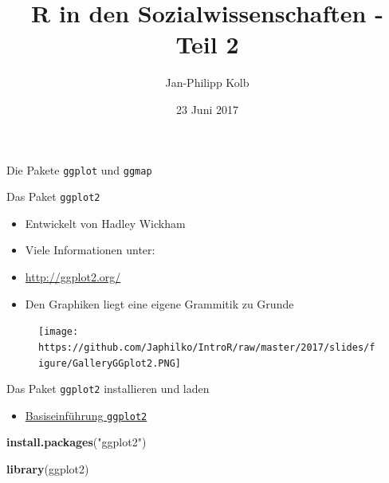 \documentclass[ignorenonframetext,]{beamer}
\title{R in den Sozialwissenschaften - Teil 2}
\author{Jan-Philipp Kolb}
\date{23 Juni 2017}
\newenvironment{Shaded}{}{}
\newcommand{\KeywordTok}[1]{\textcolor[rgb]{0.00,0.44,0.13}{\textbf{{#1}}}}
\newcommand{\StringTok}[1]{\textcolor[rgb]{0.25,0.44,0.63}{{#1}}}
\newcommand{\NormalTok}[1]{{#1}}
\providecommand{\tightlist}{%
\setlength{\itemsep}{0pt}\setlength{\parskip}{0pt}}
\begin{document}
\frame{\titlepage}

\begin{frame}{Die Pakete \texttt{ggplot} und \texttt{ggmap}}

\end{frame}

\begin{frame}{Das Paket \texttt{ggplot2}}

\begin{itemize}
\tightlist
\item
  Entwickelt von Hadley Wickham
\item
  Viele Informationen unter:
\item
  \url{http://ggplot2.org/}
\item
  Den Graphiken liegt eine eigene Grammitik zu Grunde
\end{itemize}

\begin{figure}[htbp]
\centering
\texttt{[image: https://github.com/Japhilko/IntroR/raw/master/2017/slides/figure/GalleryGGplot2.PNG]}
\caption{}
\end{figure}

\end{frame}

\begin{frame}[fragile]{Das Paket \texttt{ggplot2} installieren und
laden}

\begin{itemize}
\tightlist
\item
  \href{www.r-bloggers.com/basic-introduction-to-ggplot2/}{Basiseinführung
  \texttt{ggplot2}}
\end{itemize}

\begin{Shaded}
\begin{Highlighting}[]
\KeywordTok{install.packages}\NormalTok{(}\StringTok{"ggplot2"}\NormalTok{)}
\end{Highlighting}
\end{Shaded}

\begin{Shaded}
\begin{Highlighting}[]
\KeywordTok{library}\NormalTok{(ggplot2)}
\end{Highlighting}
\end{Shaded}

\end{frame}
\end{document}
